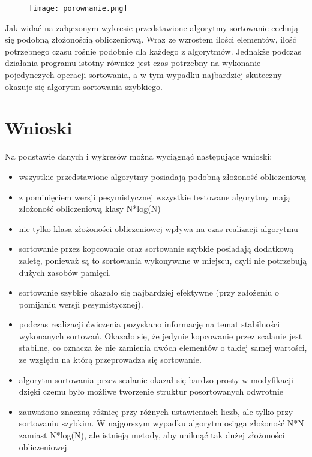 \documentclass[12pt,a4paper,titlepage]{article}
\begin{document}
\begin{figure}[h]
\begin{center}
\texttt{[image: porownanie.png]}
\end{center}
\end{figure}

Jak widać na załączonym wykresie przedstawione algorytmy sortowanie cechują się podobną złożonością obliczeniową. Wraz ze wzrostem ilości elementów, ilość potrzebnego czasu rośnie podobnie dla każdego z algorytmów. Jednakże podczas działania programu istotny również jest czas potrzebny na wykonanie pojedynczych operacji sortowania, a w tym wypadku najbardziej skuteczny okazuje się algorytm sortowania szybkiego.

\newpage
\section{Wnioski}
Na podstawie danych i wykresów można wyciągnąć następujące wnioski:
\begin{itemize}
\item wszystkie przedstawione algorytmy posiadają podobną złożoność obliczeniową
\item z pominięciem wersji pesymistycznej wszystkie testowane algorytmy mają złożoność obliczeniową klasy N*log(N)
\item nie tylko klasa złożoności obliczeniowej wpływa na czas realizacji algorytmu
\item sortowanie przez kopcowanie oraz sortowanie szybkie posiadają dodatkową zaletę, ponieważ są to sortowania wykonywane w miejscu, czyli nie potrzebują dużych zasobów pamięci.
\item sortowanie szybkie okazało się najbardziej efektywne (przy założeniu o pomijaniu wersji pesymistycznej).
\item podczas realizacji ćwiczenia pozyskano informację na temat stabilności wykonanych sortowań. Okazało się, że jedynie kopcowanie przez scalanie jest stabilne, co oznacza że nie zamienia dwóch elementów o takiej samej wartości, ze względu na którą przeprowadza się sortowanie.
\item algorytm sortowania przez scalanie okazał się bardzo prosty w modyfikacji dzięki czemu było możliwe tworzenie struktur posortowanych odwrotnie
\item zauważono znaczną różnicę przy różnych ustawieniach liczb, ale tylko przy sortowaniu szybkim. W najgorszym wypadku algorytm osiąga złożoność N*N zamiast N*log(N), ale istnieją metody, aby uniknąć tak dużej złożoności obliczeniowej.
\end{itemize}
\end{document}
